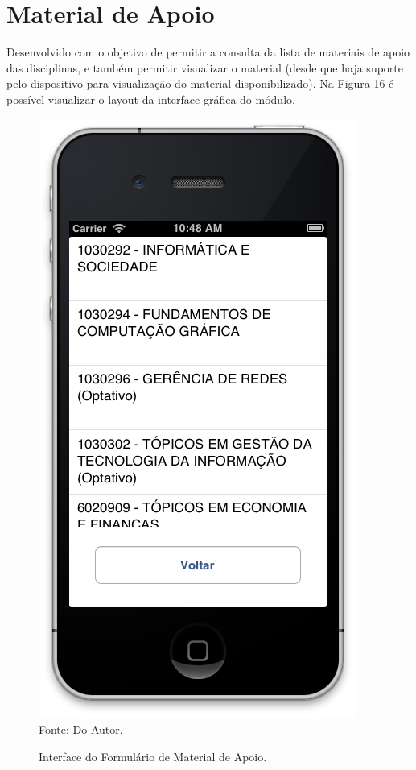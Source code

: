 \section{Material de Apoio}
Desenvolvido com o objetivo de permitir a consulta da lista de materiais de apoio das disciplinas, e também permitir visualizar o material (desde que haja suporte pelo dispositivo para visualização do material disponibilizado). Na Figura 16 é possível visualizar o layout da interface gráfica do módulo.

\begin{figure}[!htb]
     \centering
     \caption[Formulário Material de Apoio - Interface]{Interface do Formulário de Material de Apoio.}
     \includegraphics[scale=0.5]{imagens/formmaterialapoio.png}
     \\  Fonte: Do Autor.
\end{figure}

